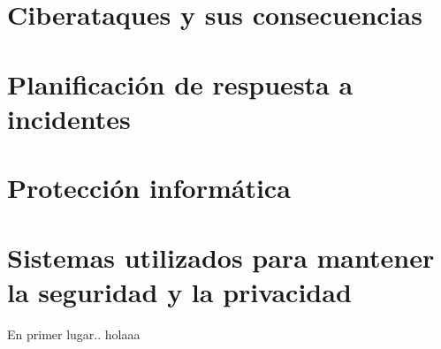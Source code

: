 \section{Ciberataques y sus consecuencias}
\label{sec:ciberataques-y-consecuencias}


\section{Planificación de respuesta a incidentes}
\label{sec:planificacion-de-respuesta}


\section{Protección informática}
\label{sec:proteccion-informatica}


\section{Sistemas utilizados para mantener la seguridad y la privacidad}
\label{sec: tipos-sistemas}

En primer lugar.\cite{rstudio}. holaaa










